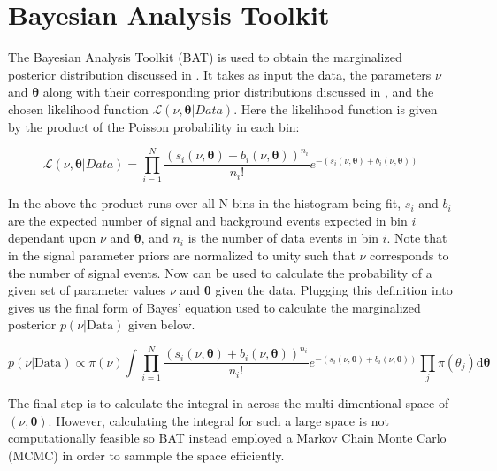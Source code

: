 \section{Bayesian Analysis Toolkit} \label{sec:fit:bat}

The Bayesian Analysis Toolkit (BAT) \cite{Beaujean:2011zz,Beresford:2642397} is
used to obtain the marginalized posterior distribution 
discussed in .  It takes as input the data, the parameters
$\nu$ and $\boldsymbol{\theta}$ along with their corresponding prior
distributions discussed in , and the chosen likelihood
function $\mathcal{L}(\nu,\boldsymbol{\theta}|Data)$.  Here the likelihood
function is given by the product of the Poisson probability in each bin: 

\begin{equation} \label{sec:fit:likelihood}
\mathcal{L}(\nu,\boldsymbol{\theta}|Data) = \prod_{i=1}^{N} \frac{(s_{i}(\nu,\boldsymbol{\theta}) + b_{i}(\nu,\boldsymbol{\theta}))^{n_{i}}}{n_{i}!} e^{-(s_{i}(\nu,\boldsymbol{\theta}) + b_{i}(\nu,\boldsymbol{\theta}))}
\end{equation}

In the above the product runs over all N bins in the histogram being fit,
$s_{i}$ and $b_{i}$ are the expected number of signal and background events
expected in bin $i$ dependant upon $\nu$ and $\boldsymbol{\theta}$, and $n_{i}$
is the number of data events in bin $i$.  Note that in 
the signal parameter priors are normalized to unity such that $\nu$ corresponds
to the number of signal events. Now  can be used to
calculate the probability of a given set of parameter values $\nu$ and
$\boldsymbol{\theta}$ given the data.  Plugging this definition into
 gives us the final form of Bayes' equation used to
calculate the marginalized posterior $p(\nu|\text{Data})$ given below.

\begin{equation} \label{sec:fit:full_bayes}
p(\nu|\text{Data}) \propto \pi(\nu) \int \prod_{i=1}^{N} \frac{(s_{i}(\nu,\boldsymbol{\theta}) + b_{i}(\nu,\boldsymbol{\theta}))^{n_{i}}}{n_{i}!} e^{-(s_{i}(\nu,\boldsymbol{\theta}) + b_{i}(\nu,\boldsymbol{\theta}))} \prod_{j}\pi(\theta_j)\text{d}\boldsymbol{\theta}
\end{equation}

The final step is to calculate the integral in  across
the multi-dimentional space of $(\nu,\boldsymbol{\theta})$. However, calculating the
integral for such a large space is not computationally feasible so BAT instead
employed a Markov Chain Monte Carlo (MCMC) \cite{Betancourt2017ACI,
Beresford:2642397} in order to sammple the space efficiently.


